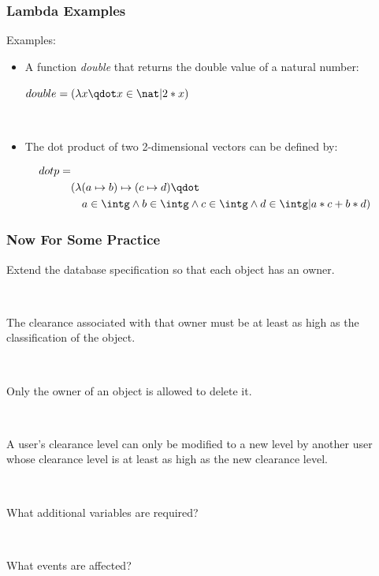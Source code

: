 \documentclass{beamer}
\begin{document}
\begin{frame}
\frametitle{Lambda Examples}
Examples:
\begin{itemize}
\item A function \emph{double} that returns the double value of a natural number:\\
\begin{center}
 $double = (\lambda x \qdot  x \in \nat | 2 * x)$
\end{center}
~

\item The dot product of two 2-dimensional vectors can be defined by:\\
\end{itemize}
\begin{equation}
\begin{split}
dotp = &\\
&(\lambda(a \mapsto b) \mapsto (c \mapsto d) \qdot\\
&\quad a \in \intg \land b \in \intg \land c \in \intg \land d \in \intg | a * c + b * d)
\end{split}
\notag
\end{equation}

\end{frame}



\begin{frame}
\frametitle{Now For Some Practice}

Extend the database specification so that each object has an owner.

~

The clearance associated with that owner must be at least as
high as the classification of the object.  

~

Only the owner of an
object is allowed to delete it.

~

A user's clearance level can only be modified to a new level 
by another user whose clearance level is at least as high as the 
new clearance level.

~

What additional variables are required?

~

What events are affected?
\end{frame}
\end{document}
